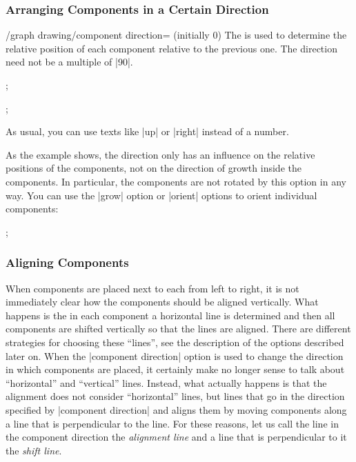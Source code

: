 {\subsubsection{Arranging Components in a Certain Direction}

\begin{key}{/graph drawing/component direction= (initially 0)}
  The  is used to determine the relative position of each
  component relative to the previous one. The direction need not be a
  multiple of |90|.
\begin{codeexample}[]
\tikz {};
\end{codeexample}
\begin{codeexample}[]
\tikz {};
\end{codeexample}
  As usual, you can use texts like |up| or |right| instead of a
  number.

  As the example shows, the direction only has an influence on the
  relative positions of the components, not on the direction of growth
  inside the components. In particular, the components are not rotated
  by this option in any way. You can use the |grow| option or |orient|
  options to orient individual components:
\begin{codeexample}[]
\tikz {};
\end{codeexample}
\end{key}



\subsubsection{Aligning Components}

When components are placed next to each from left to right, it
is not immediately clear how the components should be aligned
vertically. What happens is the in each component a horizontal line is
determined and then all components are shifted vertically so that the
lines are aligned. There are different strategies for choosing these
``lines'', see the description of the options described later on.
When the |component direction| option is used to change the direction
in which components are placed, it certainly make no longer sense to
talk about ``horizontal'' and ``vertical'' lines. Instead, what
actually happens is that the alignment does not consider
``horizontal'' lines, but lines that go in the direction specified by
|component direction| and aligns them by moving components along a
line that is perpendicular to the line. For these reasons, let us call
the line in the component direction the \emph{alignment line} and a
line that is perpendicular to it the \emph{shift line}.

}
